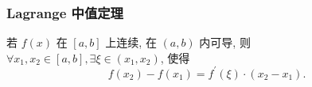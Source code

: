 % 
% 
% 
% 
% 
% 
% 

\subsubsection{Lagrange 中值定理}

\begin{theorem}
    若 $ f(x) $ 在 $ [a, b] $ 上连续, 在 $ (a, b) $ 内可导, 则 $ \forall x_{1}, x_{2} \in[a, b], \exists \xi \in\left(x_{1}, x_{2}\right) $, 使得
    $$f\left(x_{2}\right)-f\left(x_{1}\right)=f^{\prime}(\xi)\cdot(x_{2}-x_{1}) .$$
\end{theorem}

